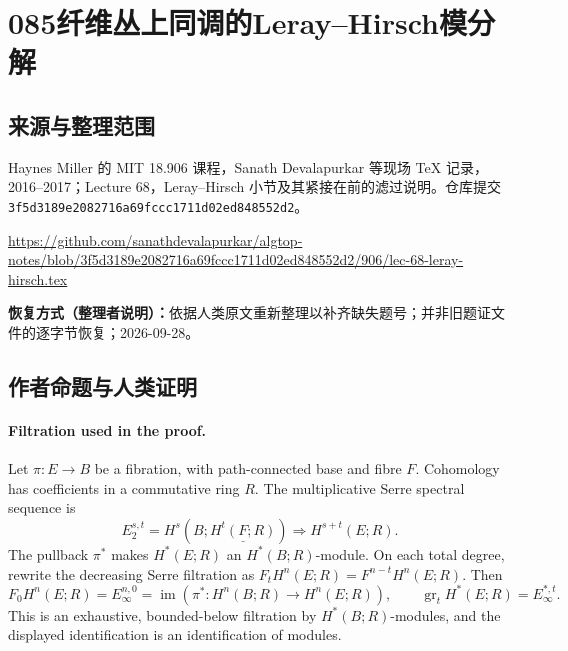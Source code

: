 \documentclass[UTF8,11pt]{ctexart}
\theoremstyle{definition}
\DeclareMathOperator{\im}{im}
\begin{document}
\section*{085\quad 纤维丛上同调的Leray--Hirsch模分解}
\subsection*{来源与整理范围}
Haynes Miller 的 MIT 18.906 课程，Sanath Devalapurkar 等现场 TeX 记录，2016--2017；Lecture 68，Leray--Hirsch 小节及其紧接在前的滤过说明。仓库提交 \nolinkurl{3f5d3189e2082716a69fccc1711d02ed848552d2}。
\par\url{https://github.com/sanathdevalapurkar/algtop-notes/blob/3f5d3189e2082716a69fccc1711d02ed848552d2/906/lec-68-leray-hirsch.tex}
\par\textbf{恢复方式（整理者说明）：}依据人类原文重新整理以补齐缺失题号；并非旧题证文件的逐字节恢复；2026-09-28。
\subsection*{作者命题与人类证明}

\paragraph{Filtration used in the proof.}
Let $\pi:E\to B$ be a fibration, with path-connected base and fibre $F$.
Cohomology has coefficients in a commutative ring $R$. The multiplicative Serre
spectral sequence is
\[
 E_2^{s,t}=H^s(B;\underline{H^t(F;R)})\Longrightarrow H^{s+t}(E;R).
\]
The pullback $\pi^*$ makes $H^*(E;R)$ an $H^*(B;R)$-module. On each total
degree, rewrite the decreasing Serre filtration as
$F_tH^n(E;R)=F^{n-t}H^n(E;R)$. Then
\[
 F_0H^n(E;R)=E_\infty^{n,0}=\im(\pi^*:H^n(B;R)\to H^n(E;R)),
 \qquad \operatorname{gr}_tH^*(E;R)=E_\infty^{*,t}.
\]
This is an exhaustive, bounded-below filtration by $H^*(B;R)$-modules, and
the displayed identification is an identification of modules.
\end{document}
